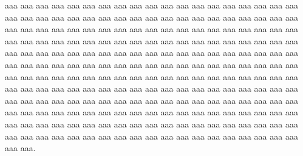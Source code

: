 aaa aaa aaa aaa aaa aaa aaa aaa aaa aaa aaa aaa aaa aaa aaa aaa aaa aaa aaa aaa aaa aaa aaa aaa aaa aaa aaa aaa aaa aaa aaa aaa aaa aaa aaa aaa aaa aaa aaa aaa aaa aaa aaa aaa aaa aaa aaa aaa aaa aaa aaa aaa aaa aaa aaa aaa aaa aaa aaa aaa aaa aaa aaa aaa aaa aaa aaa aaa aaa aaa aaa aaa aaa aaa aaa aaa aaa aaa aaa aaa aaa aaa aaa aaa aaa aaa aaa aaa aaa aaa aaa aaa aaa aaa aaa aaa aaa aaa aaa aaa aaa aaa aaa aaa aaa aaa aaa aaa aaa aaa aaa aaa aaa aaa aaa aaa aaa aaa aaa aaa aaa aaa aaa aaa aaa aaa aaa aaa aaa aaa aaa aaa aaa aaa aaa aaa aaa aaa aaa aaa aaa aaa aaa aaa aaa aaa aaa aaa aaa aaa aaa aaa aaa aaa aaa aaa aaa aaa aaa aaa aaa aaa aaa aaa aaa aaa aaa aaa aaa aaa aaa aaa aaa aaa aaa aaa aaa aaa aaa aaa aaa aaa aaa aaa aaa aaa aaa aaa aaa aaa aaa aaa aaa aaa aaa aaa aaa aaa aaa aaa aaa aaa aaa aaa aaa aaa aaa aaa aaa aaa aaa aaa aaa aaa aaa aaa aaa aaa aaa aaa aaa aaa aaa aaa aaa aaa aaa aaa aaa aaa.

\newpage



